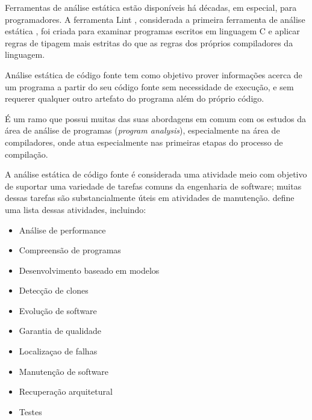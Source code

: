 Ferramentas de análise estática estão disponíveis há décadas, em especial,
para programadores. A ferramenta Lint \cite{Johnson1978}, considerada a
primeira ferramenta de análise estática \cite{Gosain2015}, foi criada para
examinar programas escritos em linguagem C e aplicar regras de tipagem mais
estritas do que as regras dos próprios compiladores da linguagem.

%

Análise estática de código fonte tem como objetivo prover
informações acerca de um programa a partir do seu código fonte sem
necessidade de execução, e sem requerer qualquer outro artefato do programa
além do próprio código.

É um ramo que possui muitas das suas abordagens em comum com os estudos da
área de análise de programas ({\it program analysis}), especialmente na área de
compiladores, onde atua especialmente nas primeiras etapas do processo de compilação.

A análise estática de código fonte é considerada uma atividade meio com
objetivo de suportar uma variedade de tarefas comuns da engenharia de
software; muitas dessas tarefas são substancialmente úteis em atividades de
manutenção.  define uma lista dessas
atividades, incluindo:

\begin{multicols}{2}
  \begin{itemize}
    \item Análise de performance
    \item Compreensão de programas
    \item Desenvolvimento baseado em modelos
    \item Detecção de clones
    \item Evolução de software
    \item Garantia de qualidade
    \item Localizaçao de falhas
    \item Manutenção de software
    \item Recuperação arquitetural
    \item Testes
  \end{itemize}
\end{multicols}

